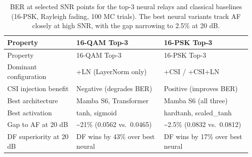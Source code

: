 \documentclass[
  english,
  12pt,
  12pt,
  a4paper,
  oneside]{report}
\begin{document}
\begin{longtable}[]{@{}
  >{\raggedright\arraybackslash}p{}
  >{\raggedright\arraybackslash}p{}
  >{\raggedright\arraybackslash}p{}@{}}
\caption{BER at selected SNR points for the top-3 neural relays and classical baselines (16-PSK, Rayleigh fading, 100 MC trials). The best neural variants track AF closely at high SNR, with the gap narrowing to 2.5\% at 20 dB.}\label{tbl:table20}\tabularnewline
\toprule\noalign{}
\begin{minipage}[b]{\linewidth}\raggedright
Property
\end{minipage} & \begin{minipage}[b]{\linewidth}\raggedright
16-QAM Top-3
\end{minipage} & \begin{minipage}[b]{\linewidth}\raggedright
16-PSK Top-3
\end{minipage} \\
\midrule\noalign{}
\endfirsthead
\toprule\noalign{}
\begin{minipage}[b]{\linewidth}\raggedright
Property
\end{minipage} & \begin{minipage}[b]{\linewidth}\raggedright
16-QAM Top-3
\end{minipage} & \begin{minipage}[b]{\linewidth}\raggedright
16-PSK Top-3
\end{minipage} \\
\midrule\noalign{}
\endhead
\bottomrule\noalign{}
\endlastfoot
Dominant configuration & +LN (LayerNorm only) & +CSI / +CSI+LN \\
CSI injection benefit & Negative (degrades BER) & Positive (improves BER) \\
Best architecture & Mamba S6, Transformer & Mamba S6 (all three) \\
Best activation & tanh, sigmoid & hardtanh, scaled\_tanh \\
Gap to AF at 20 dB & \textasciitilde21\% (0.0562 vs.~0.0465) & \textasciitilde2.5\% (0.0832 vs.~0.0812) \\
DF superiority at 20 dB & DF wins by 43\% over best neural & DF wins by 17\% over best neural \\
\end{longtable}
\end{document}
